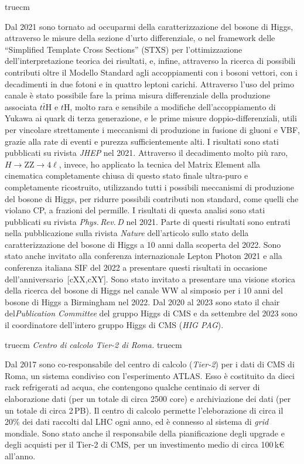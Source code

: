 \documentclass[11pt,twoside,a4paper]{article}
\begin{document}
 truecm

Dal 2021 sono tornato ad occuparmi della caratterizzazione del bosone
di Higgs, attraverso le misure della sezione d'urto differenziale, o
nel framework delle ``Simplified Template Cross Sections'' (STXS) per
l'ottimizzazione dell'interpretazione teorica dei risultati, e,
infine, attraverso la ricerca di possibili contributi oltre il Modello
Standard agli accoppiamenti con i bosoni vettori, con i decadimenti in
due fotoni e in quattro leptoni carichi. Attraverso l'uso del primo
canale \`e stato possibile fare la prima misura differenziale della
produzione associata $t\bar t$H e $t$H, molto rara e sensibile a
modifiche dell'accoppiamento di Yukawa ai quark di terza generazione,
e le prime misure doppio-differenziali, utili per vincolare
strettamente i meccanismi di produzione in fusione di gluoni e VBF,
grazie alla rate di eventi e purezza sufficientemente alti.  I
risultati sono stati pubblicati su rivista \textit{JHEP} nel 2021.
Attraverso il decadimento molto pi\`u raro, $H\to$ZZ$\to 4\ell$,
invece, ho applicato la tecnica del Matrix Element alla cinematica
completamente chiusa di questo stato finale ultra-puro e completamente
ricostruito, utilizzando tutti i possibili meccanismi di produzione
del bosone di Higgs, per ridurre possibili contributi non standard,
come quelli che violano CP, a frazioni del permille. I risultati di
questa analisi sono stati pubblicati su rivista
\textit{Phys.\,Rev.\,D} nel 2021.  Parte di questi risultati sono
entrati nella pubblicazione sulla rivista \textit{Nature}
dell'articolo sullo stato della caratterizzazione del bosone di Higgs
a 10 anni dalla scoperta del 2022. Sono stato anche invitato alla
conferenza internazionale Lepton Photon 2021 e alla conferenza
italiana SIF del 2022 a presentare questi risultati in occasione
dell'anniversario~[cXX,cXY]. Sono stato invitato a presentare una
visione storica della ricerca del bosone di Higgs nel canale WW al
simposio per i 10 anni del bosone di Higgs a Birmingham nel 2022. Dal
2020 al 2023 sono stato il chair del\textit{Publication Committee} del
gruppo Higgs di CMS e da settembre del 2023 sono il coordinatore
dell'intero gruppo Higgs di CMS (\textit{HIG PAG}).




 truecm
\textit{Centro di calcolo Tier-2 di Roma.}
 truecm

Dal 2017 sono co-responsabile del centro di calcolo (\textit{Tier-2})
per i dati di CMS di Roma, un sistema condiviso con l'esperimento
ATLAS. Esso \`e costituito da dieci rack refrigerati ad acqua, che
contengono qualche centinaio di server di elaborazione dati (per un
totale di circa 2500 core) e archiviazione dei dati (per un totale di
circa 2\,PB). Il centro di calcolo permette l'eleborazione di circa il
20\% dei dati raccolti dal LHC ogni anno, ed \`e connesso al sistema
di \textit{grid} mondiale. Sono stato anche il responsabile della
pianificazione degli upgrade e degli acquisti per il Tier-2 di CMS,
per un investimento medio di circa 100\,k\euro{} all'anno.
\end{document}
